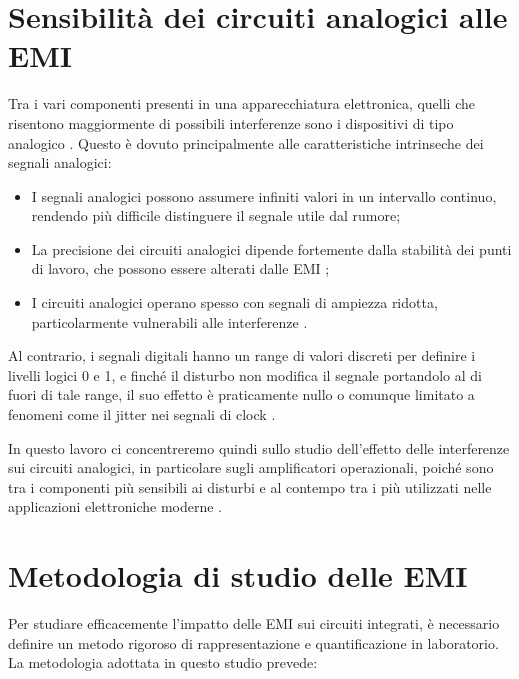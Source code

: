 \section{Sensibilità dei circuiti analogici alle EMI}
Tra i vari componenti presenti in una apparecchiatura elettronica, quelli che risentono maggiormente di possibili interferenze sono i dispositivi di tipo analogico \cite{capitolo2, An_EMI-Resistant_Common-Mode_Cancelation_Differential_Input_Stage_in_UMC_180_nm_CMOS}. Questo è dovuto principalmente alle caratteristiche intrinseche dei segnali analogici:
\begin{itemize}
    \item I segnali analogici possono assumere infiniti valori in un intervallo continuo, rendendo più difficile distinguere il segnale utile dal rumore;
    \item La precisione dei circuiti analogici dipende fortemente dalla stabilità dei punti di lavoro, che possono essere alterati dalle EMI \cite{TR2016};
    \item I circuiti analogici operano spesso con segnali di ampiezza ridotta, particolarmente vulnerabili alle interferenze \cite{Redoute-Richelli_EMC_Magazine}.
\end{itemize}

Al contrario, i segnali digitali hanno un range di valori discreti per definire i livelli logici 0 e 1, e finché il disturbo non modifica il segnale portandolo al di fuori di tale range, il suo effetto è praticamente nullo o comunque limitato a fenomeni come il jitter nei segnali di clock \cite{capitolo2}.

In questo lavoro ci concentreremo quindi sullo studio dell'effetto delle interferenze sui circuiti analogici, in particolare sugli amplificatori operazionali, poiché sono tra i componenti più sensibili ai disturbi e al contempo tra i più utilizzati nelle applicazioni elettroniche moderne \cite{capitolo2, EMI_Immunity_of_the_Nauta_Inverter-Based_Amplifier}.

\section{Metodologia di studio delle EMI}
Per studiare efficacemente l'impatto delle EMI sui circuiti integrati, è necessario definire un metodo rigoroso di rappresentazione e quantificazione in laboratorio. La metodologia adottata in questo studio prevede:

